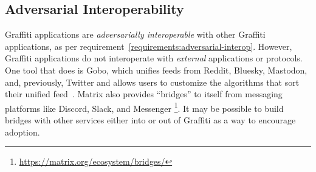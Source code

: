 
\subsection{Adversarial Interoperability}

Graffiti applications are \emph{adversarially interoperable} with other Graffiti
applications, as per requirement~\ref{requirements:adversarial-interop}.
However, Graffiti applications do not interoperate with \emph{external}
applications or protocols.
One tool that does is Gobo, which unifies feeds from Reddit, Bluesky,
Mastodon, and, previously, Twitter
and allows users to customize the algorithms that sort their unified feed~\cite{gobo}.
Matrix also provides ``bridges'' to itself from messaging platforms like
Discord, Slack, and Messenger
\footnote{
    \url{https://matrix.org/ecosystem/bridges/}
}.
It may be possible to build bridges with other services either into or out of
Graffiti as a way to encourage adoption.





